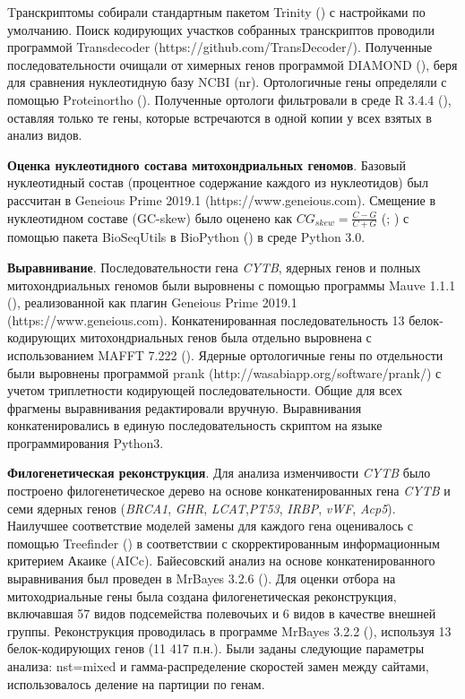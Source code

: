 Tранскриптомы собирали стандартным пакетом Trinity (\cite{Grabherr2011}) с настройками по умолчанию. Поиск кодирующих участков собранных транскриптов проводили программой Transdecoder (https://github.com/TransDecoder/). Полученные последовательности очищали от химерных генов программой DIAMOND (\cite{Buchfink2015}), беря для сравнения нуклеотидную базу NCBI (nr). Ортологичные гены определяли с помощью Proteinortho (\cite{Lechner2011}). Полученные ортологи фильтровали в среде R 3.4.4 (\cite{RCoreTeam2017}), оставляя только те гены, которые встречаются в одной копии у всех взятых в анализ видов. 

\textbf{Оценка нуклеотидного состава митохондриальных геномов}. Базовый нуклеотидный состав (процентное содержание каждого из нуклеотидов) был рассчитан в Geneious Prime 2019.1 (https://www.geneious.com). Смещение в нуклеотидном составе (GC-skew) было оценено как $CG_{skew} = \frac{C - G}{C + G}$ (\cite{Arabi2010}; \cite{Hassanin2005}) с помощью пакета BioSeqUtils в BioPython (\cite{Cock2009}) в среде Python 3.0. 

\textbf{Выравнивание}. Последовательности гена \textit{CYTB}, ядерных генов и полных митохондриальных геномов были выровнены с помощью программы Mauve 1.1.1 (\cite{Darling2004}), реализованной как плагин Geneious Prime 2019.1 (https://www.geneious.com). Конкатенированная последовательность 13 белок-кодирующих митохондриальных генов была отдельно выровнена с использованием MAFFT 7.222 (\cite{Katoh2014}). Ядерные ортологичные гены по отдельности были выровнены программой prank (http://wasabiapp.org/software/prank/) с учетом триплетности кодирующей последовательности. Общие для всех фрагмены выравнивания редактировали вручную. Выравнивания конкатенировались в единую последовательность скриптом на языке программирования Python3.

\textbf{Филогенетическая реконструкция}. Для анализа изменчивости \textit{CYTB} было построено филогенетическое дерево на основе конкатенированных гена \textit{CYTB} и семи ядерных генов (\textit{BRCA1}, \textit{GHR}, \textit{LCAT},\textit{PT53}, \textit{IRBP}, \textit{vWF}, \textit{Acp5}). Наилучшее соответствие моделей замены для каждого гена оценивалось с помощью Treefinder (\cite{Jobb2004}) в соответствии с скорректированным информационным критерием Акаике (AICc). Байесовский анализ на основе конкатенированного выравнивания был проведен в MrBayes 3.2.6 (\cite{Ronquist2012}). Для оценки отбора на митоходриальные гены была создана филогенетическая реконструкция, включавшая 57 видов подсемейства полевочьих и 6 видов в качестве внешней группы. Реконструкция проводилась в программе MrBayes 3.2.2 (\cite{Ronquist2012}), используя 13 белок-кодирующих генов (11 417 п.н.). Были заданы следующие параметры анализа: nst=mixed и гамма-распределение скоростей замен между сайтами, использовалось деление на партиции по генам. 

